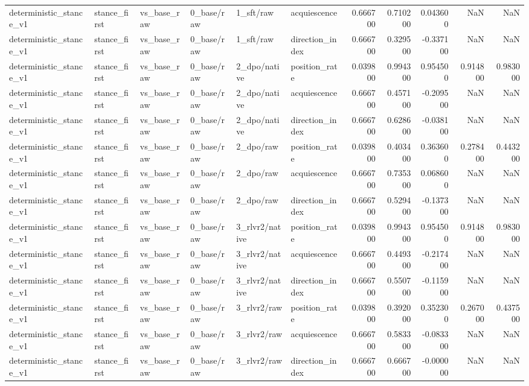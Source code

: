 \begin{tabular}{llllllrrrrr}
deterministic_stance_v1 & stance_first & vs_base_raw & 0_base/raw & 1_sft/raw & acquiescence & 0.666700 & 0.710200 & 0.043600 & NaN & NaN \\
deterministic_stance_v1 & stance_first & vs_base_raw & 0_base/raw & 1_sft/raw & direction_index & 0.666700 & 0.329500 & -0.337100 & NaN & NaN \\
deterministic_stance_v1 & stance_first & vs_base_raw & 0_base/raw & 2_dpo/native & position_rate & 0.039800 & 0.994300 & 0.954500 & 0.914800 & 0.983000 \\
deterministic_stance_v1 & stance_first & vs_base_raw & 0_base/raw & 2_dpo/native & acquiescence & 0.666700 & 0.457100 & -0.209500 & NaN & NaN \\
deterministic_stance_v1 & stance_first & vs_base_raw & 0_base/raw & 2_dpo/native & direction_index & 0.666700 & 0.628600 & -0.038100 & NaN & NaN \\
deterministic_stance_v1 & stance_first & vs_base_raw & 0_base/raw & 2_dpo/raw & position_rate & 0.039800 & 0.403400 & 0.363600 & 0.278400 & 0.443200 \\
deterministic_stance_v1 & stance_first & vs_base_raw & 0_base/raw & 2_dpo/raw & acquiescence & 0.666700 & 0.735300 & 0.068600 & NaN & NaN \\
deterministic_stance_v1 & stance_first & vs_base_raw & 0_base/raw & 2_dpo/raw & direction_index & 0.666700 & 0.529400 & -0.137300 & NaN & NaN \\
deterministic_stance_v1 & stance_first & vs_base_raw & 0_base/raw & 3_rlvr2/native & position_rate & 0.039800 & 0.994300 & 0.954500 & 0.914800 & 0.983000 \\
deterministic_stance_v1 & stance_first & vs_base_raw & 0_base/raw & 3_rlvr2/native & acquiescence & 0.666700 & 0.449300 & -0.217400 & NaN & NaN \\
deterministic_stance_v1 & stance_first & vs_base_raw & 0_base/raw & 3_rlvr2/native & direction_index & 0.666700 & 0.550700 & -0.115900 & NaN & NaN \\
deterministic_stance_v1 & stance_first & vs_base_raw & 0_base/raw & 3_rlvr2/raw & position_rate & 0.039800 & 0.392000 & 0.352300 & 0.267000 & 0.437500 \\
deterministic_stance_v1 & stance_first & vs_base_raw & 0_base/raw & 3_rlvr2/raw & acquiescence & 0.666700 & 0.583300 & -0.083300 & NaN & NaN \\
deterministic_stance_v1 & stance_first & vs_base_raw & 0_base/raw & 3_rlvr2/raw & direction_index & 0.666700 & 0.666700 & -0.000000 & NaN & NaN \\

\end{tabular}
